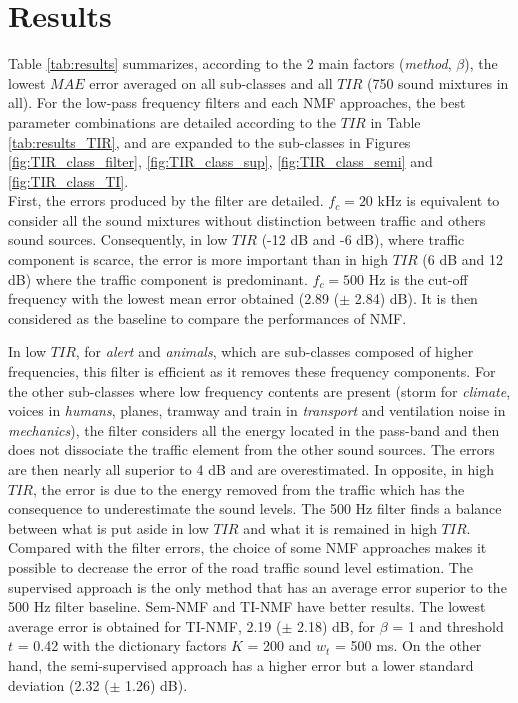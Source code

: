 \documentclass[twocolumn]{svjour3}          %
\begin{document}
\section{Results}\label{part:results}

Table \ref{tab:results} summarizes, according to the 2 main factors (\textit{method}, $\beta$), the lowest $MAE$ error averaged on all sub-classes and all $TIR$ (750 sound mixtures in all). For the low-pass frequency filters and each NMF approaches, the best parameter combinations are detailed according to the $TIR$ in Table \ref{tab:results_TIR},  and are expanded to the sub-classes in Figures \ref{fig:TIR_class_filter}, \ref{fig:TIR_class_sup}, \ref{fig:TIR_class_semi} and \ref{fig:TIR_class_TI}. \\

First, the errors produced by the filter are detailed. $f_c = 20 $ kHz is equivalent to consider all the sound mixtures without distinction between traffic and others sound sources. Consequently, in low $TIR$ (-12 dB and -6 dB), where traffic component is scarce, the error is more important than in high $TIR$ (6 dB and 12 dB) where the traffic component is predominant. $f_c = 500$ Hz is the cut-off frequency with the lowest mean error obtained (2.89 ($\pm$ 2.84) dB). It is then considered as the baseline to compare the performances of NMF.

In low $TIR$, for \textit{alert} and \textit{animals}, which are sub-classes composed of higher frequencies, this filter is efficient as it removes these frequency components. For the other sub-classes where low frequency contents are present (storm for \textit{climate}, voices in \textit{humans}, planes, tramway and train in \textit{transport} and ventilation noise in \textit{mechanics}), the filter considers all the energy located in the pass-band and then does not dissociate the traffic element from the other sound sources. The errors are then nearly all superior to 4 dB and are overestimated. In opposite, in high $TIR$, the error is due to the energy removed from the traffic which has the consequence to underestimate the sound levels. The 500 Hz filter finds a balance between what is put aside in low $TIR$ and what it is remained in high $TIR$. \\

Compared with the filter errors, the choice of some NMF approaches makes it possible to decrease the error of the road traffic sound level estimation. The supervised approach is the only method that has an average error superior to the 500 Hz filter baseline. Sem-NMF and TI-NMF have better results. The lowest average error is obtained for TI-NMF, 2.19 ($\pm$ 2.18) dB, for $\beta$ = 1 and threshold $t$ = 0.42 with the dictionary factors $K$ = 200 and $w_t$ = 500 ms. On the other hand, the semi-supervised approach has a higher error but a lower standard deviation (2.32 ($\pm$ 1.26) dB).
\end{document}
